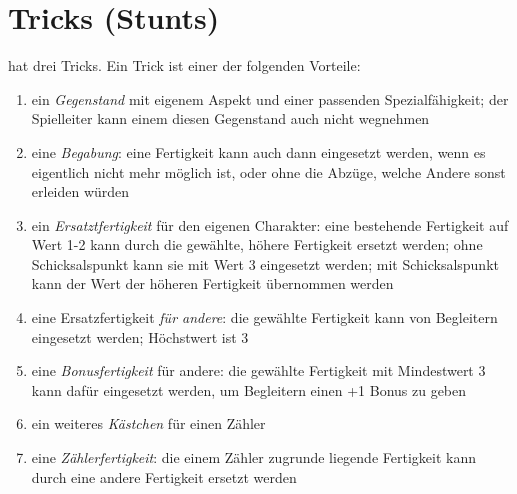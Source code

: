 \documentclass{tufte-handout}
\begin{document}
\section{Tricks (Stunts)}

 hat drei Tricks. Ein Trick ist
einer der folgenden Vorteile:

\begin{enumerate}

\item ein \textit{Gegenstand} mit eigenem Aspekt und einer passenden
  Spezialfähigkeit; der Spielleiter kann einem diesen Gegenstand auch
  nicht wegnehmen

\item eine \textit{Begabung}: eine Fertigkeit kann auch dann
  eingesetzt werden, wenn es eigentlich nicht mehr möglich ist, oder
  ohne die Abzüge, welche Andere sonst erleiden würden

\item ein \textit{Ersatztfertigkeit} für den eigenen Charakter: eine
  bestehende Fertigkeit auf Wert 1-2 kann durch die gewählte, höhere
  Fertigkeit ersetzt werden; ohne Schicksalspunkt kann sie mit Wert 3
  eingesetzt werden; mit Schicksalspunkt kann der Wert der höheren
  Fertigkeit übernommen werden

\item eine Ersatzfertigkeit \textit{für andere}: die gewählte
  Fertigkeit kann von Begleitern eingesetzt werden; Höchstwert ist 3

\item eine \textit{Bonusfertigkeit} für andere: die gewählte Fertigkeit
  mit Mindestwert 3 kann dafür eingesetzt werden, um Begleitern einen
  +1 Bonus zu geben

\item ein weiteres \textit{Kästchen} für einen Zähler

\item eine \textit{Zählerfertigkeit}: die einem Zähler zugrunde
  liegende Fertigkeit kann durch eine andere Fertigkeit ersetzt
  werden

\end{enumerate}
\end{document}
